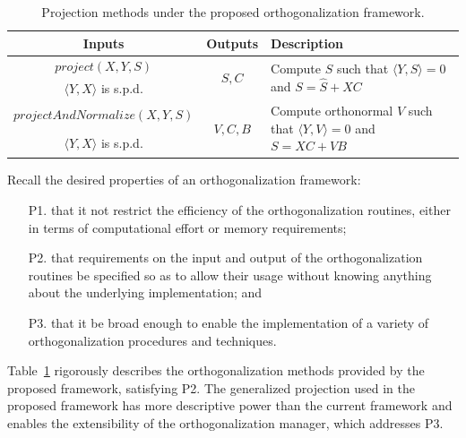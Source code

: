 \documentclass[12pt,letterpaper]{SANDreport}
\theoremstyle{example}
\newcommand{\inner}[2]{\langle #1,#2 \rangle}
\begin{document}
\begin{table}[ht]
  \centering
  \caption[Proposed Ortho. Methods]{Projection methods under the proposed
  orthogonalization framework.}
  \begin{tabular}{|c|c|p{7cm}|}
    \hline \hline
    Inputs                       & Outputs     & Description \\ \hline 

    $project(X,Y,S)$         & \multirow{2}{*}{$\hat{S},C$}
    & \multirow{2}{7cm}{Compute $\hat{S}$ such that $\inner{Y}{\hat{S}} = 0$ and
    $S = \hat{S} + X C$} \\
    $\inner{Y}{X}$ is s.p.d. & & \\\hline

    $projectAndNormalize(X,Y,S)$ & \multirow{2}{*}{$V,C,B$}
    & \multirow{2}{7cm}{Compute orthonormal $V$ such that $\inner{Y}{V}=0$ and $S =
    XC+VB$} \\ 
    $\inner{Y}{X}$ is s.p.d. & & \\\hline

    \hline
  \end{tabular}
  \label{tbl:proposed}
\end{table}



Recall the desired properties of an orthogonalization framework: 
\begin{enumerate}
  \item[P1.] that it not restrict the efficiency of the orthogonalization routines, either in 
    terms of computational effort or memory requirements;
  \item[P2.] that requirements on the input and output of the orthogonalization routines
    be specified so as to allow their usage without knowing anything about the underlying
    implementation; and 
  \item[P3.] that it be broad enough to enable the implementation of a variety of 
    orthogonalization procedures and techniques.
\end{enumerate}
Table~\ref{tbl:proposed} rigorously describes the orthogonalization methods provided by
the proposed framework, satisfying P2. The generalized projection used in the proposed
framework has more descriptive power than the current framework and enables the
extensibility of the orthogonalization manager, which addresses P3.
\end{document}
